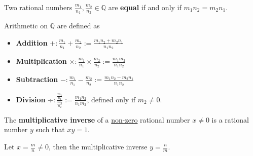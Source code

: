 \documentclass[11pt]{article}
\begin{document}
	\begin{definition}
		Two rational numbers $\frac{m_1}{n_1}, \frac{m_2}{n_2} \in \mathbb{Q}$ are \textbf{equal} if and only if  $m_1 n_2 = m_2 n_1$.
	\end{definition}
	
	\begin{definition}
		Arithmetic on $\mathbb{Q}$ are defined as 
		\begin{itemize}
			\item \textbf{Addition} $+: \frac{m_1}{n_1} + \frac{m_2}{n_2} := \frac{m_1 n_2 + m_2 n_1}{n_1 n_2}$
			\item \textbf{Multiplication} $\times: \frac{m_1}{n_1} \times \frac{m_2}{n_2} := \frac{m_1 m_2}{n_1 n_2}$
			\item \textbf{Subtraction} $-: \frac{m_1}{n_1} - \frac{m_2}{n_2} := \frac{m_1 n_2 - m_2 n_1}{n_1 n_2}$
			\item \textbf{Division} $\div: \frac{\frac{m_1}{n_1}}{\frac{m_2}{n_2}} := \frac{m_1 n_2}{n_1 m_2}$, defined only if $m_2 \neq 0$.
		\end{itemize}
	\end{definition}
	
	\begin{definition}
		The \textbf{multiplicative inverse} of a \ul{non-zero} rational number $x \neq 0$ is a rational number $y$ such that $xy=1$.
	\end{definition}
	\begin{remark}
		Let $x = \frac{m}{n} \neq 0$, then the multiplicative inverse $y = \frac{n}{m}$.
	\end{remark}
	
\end{document}

